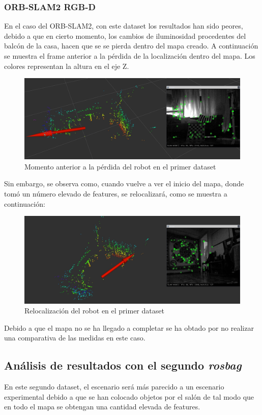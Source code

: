 \subsubsection{ORB-SLAM2 RGB-D}
En el caso del ORB-SLAM2, con este dataset los resultados han sido peores, debido a que en cierto momento, los cambios de iluminosidad procedentes del balcón de la casa, hacen que se
se pierda dentro del mapa creado. A continuación se muestra el frame anterior a la pérdida de la localización dentro del mapa. Los colores representan la altura en el eje Z.
\begin{figure}[h!]
    \centering
    \includegraphics[width=.9\textwidth]{images/slam/bag1_orb_beforeLOSE}
    \caption{Momento anterior a la pérdida del robot en el primer dataset}
\end{figure}

Sin embargo, se observa como, cuando vuelve a ver el inicio del mapa, donde tomó un número elevado de features, se relocalizará, como se muestra a continuación:
\begin{figure}[h!]
    \centering
    \includegraphics[width=.9\textwidth]{images/slam/bag1_orb_relocal}
    \caption{Relocalización del robot en el primer dataset}
\end{figure}

Debido a que el mapa no se ha llegado a completar se ha obtado por no realizar una comparativa de las medidas en este caso.

\newpage

\subsection{Análisis de resultados con el segundo \textit{rosbag}}
En este segundo dataset, el escenario será más parecido a un escenario experimental debido a que se han colocado objetos por el salón de tal modo que en todo el mapa se
obtengan una cantidad elevada de features.

